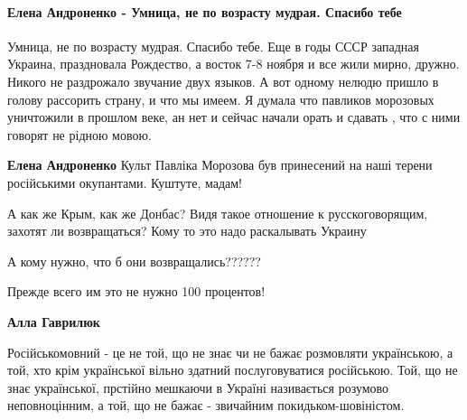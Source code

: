  
 
 
 
 
\paragraph{Елена Андроненко - Умница, не по возрасту мудрая. Спасибо тебе}

\begin{itemize}

Умница, не по возрасту мудрая. Спасибо тебе. Еще в годы СССР западная Украина,
праздновала Рождество, а восток 7-8 ноября и все жили мирно, дружно. Никого не
раздрожало звучание двух языков. А вот одному нелюдю пришло в голову рассорить
страну, и что мы имеем. Я думала что павликов морозовых уничтожили в прошлом
веке, ан нет и сейчас начали орать и сдавать , что с ними говорят не рідною
мовою.

\begin{itemize}
\textbf{Елена Андроненко} Культ Павліка Морозова був принесений на наші терени
російськими окупантами. Куштуте, мадам!
\end{itemize}


А как же Крым, как же Донбас? Видя такое отношение к русскоговорящим, захотят
ли возвращаться? Кому то это надо раскалывать Украину

\begin{itemize}
А кому нужно, что б они возвращались??????


Прежде всего им это не нужно 100 процентов!


\textbf{Алла Гаврилюк} 

Російськомовний - це не той, що не знає чи не бажає розмовляти українською, а
той, хто крім української вільно здатний послуговуватися російською. Той, що не
знає української, прстійно мешкаючи в Україні називається розумово
неповноцінним, а той, що не бажає - звичайним покидьком-шовіністом.


\end{itemize}
\end{itemize}
